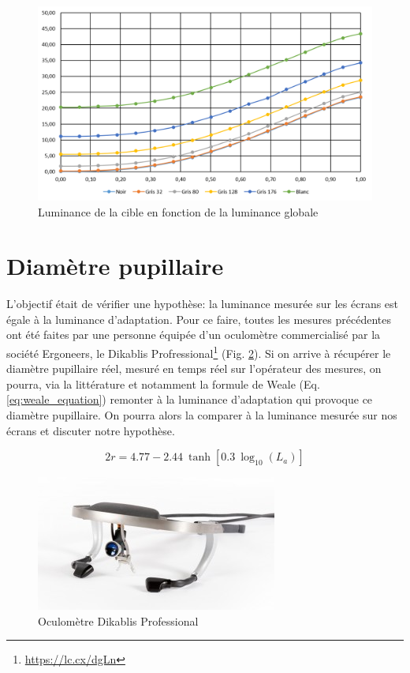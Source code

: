 	\begin{figure}[h]
		\centering
		\includegraphics[scale=.75]{Figures/EvolutionLuminanceTarget}
		\caption{Luminance de la cible en fonction de la luminance globale}
		\label{fig:evolution_luminance_target}
	\end{figure}
	
	\section{Diamètre pupillaire}
	\par L'objectif était de vérifier une hypothèse: la luminance mesurée sur les écrans est égale à la luminance d'adaptation. Pour ce faire, toutes les mesures précédentes ont été faites par une personne équipée d'un oculomètre commercialisé par la société Ergoneers, le Dikablis Profressional\footnote{\url{https://lc.cx/dgLn}} (Fig. \ref{fig:dikablis_pro}). Si on arrive à récupérer le diamètre pupillaire réel, mesuré en temps réel sur l'opérateur des mesures, on pourra, via la littérature et notamment la formule de Weale (Eq. \ref{eq:weale_equation}) remonter à la luminance d'adaptation qui provoque ce diamètre pupillaire. On pourra alors la comparer à la luminance mesurée sur nos écrans et discuter notre hypothèse.
	
	\begin{equation}
		2r = 4.77 - 2.44~\tanh[0.3~\log_{10}(L_a)]
		\label{eq:weale_equation}
	\end{equation}
	
	\begin{figure}[h]
		\centering
		\includegraphics[scale=1]{Figures/DikablisProfessional}
		\caption{Oculomètre Dikablis Professional}
		\label{fig:dikablis_pro}
	\end{figure}
	
